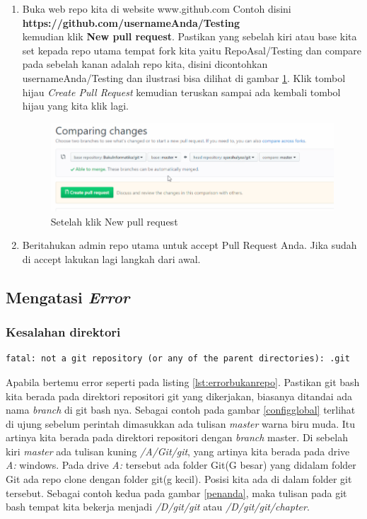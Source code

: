 \begin{enumerate}
\item Buka web repo kita di website www.github.com
Contoh disini\\
 \textbf{https://github.com/usernameAnda/Testing} \\kemudian klik \textbf{New pull request}. Pastikan yang sebelah kiri atau base kita set kepada repo utama tempat fork kita yaitu RepoAsal/Testing dan compare pada sebelah kanan adalah repo kita, disini dicontohkan usernameAnda/Testing dan ilustrasi bisa dilihat di gambar \ref{pullrequest}. Klik tombol hijau \textit{Create Pull Request} kemudian teruskan sampai ada kembali tombol hijau yang kita klik lagi.
\begin{figure}[!htbp]
\centerline{\includegraphics[width=.75\textwidth]{Figures/pullrequest}}
\caption{Setelah klik New pull request}
\label{pullrequest}
\end{figure}

\item Beritahukan admin repo utama untuk accept Pull Request Anda. Jika sudah di accept lakukan lagi langkah dari awal.
\end{enumerate}



\subsection{Mengatasi \textit{Error}}
\subsubsection{Kesalahan direktori}
\begin{lstlisting}[caption=Kesalahan karena bukan pada direktori repositori,label={lst:errorbukanrepo}]
fatal: not a git repository (or any of the parent directories): .git
\end{lstlisting}
Apabila bertemu error seperti pada listing \ref{lst:errorbukanrepo}. Pastikan git bash kita berada pada direktori repositori git yang dikerjakan, biasanya ditandai ada nama \textit{branch} di git bash nya. Sebagai contoh pada gambar \ref{configglobal} terlihat di ujung sebelum perintah dimasukkan ada tulisan \textit{master} warna biru muda. Itu artinya kita berada pada direktori repositori dengan \textit{branch} master. Di sebelah kiri \textit{master} ada tulisan kuning \textit{/A/Git/git}, yang artinya kita berada pada drive \textit{A:} windows. Pada drive \textit{A:} tersebut ada folder Git(G besar) yang didalam folder Git ada repo clone dengan folder git(g kecil). Posisi kita ada di dalam folder git tersebut.
Sebagai contoh kedua pada gambar \ref{penanda}, maka tulisan pada git bash tempat kita bekerja menjadi \textit{/D/git/git} atau \textit{/D/git/git/chapter}.

